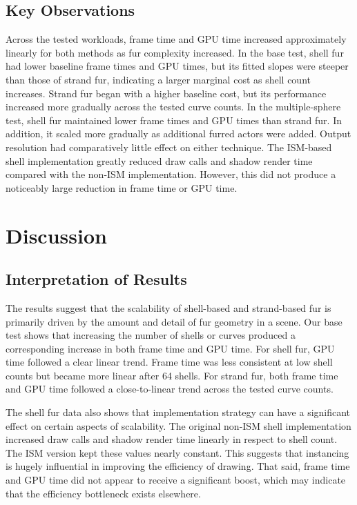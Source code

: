\documentclass{article}
\begin{document}
\subsection{Key Observations}

Across the tested workloads, frame time and GPU time increased approximately linearly for both methods as fur complexity increased. In the base test, shell fur had lower baseline frame times and GPU times, but its fitted slopes were steeper than those of strand fur, indicating a larger marginal cost as shell count increases. Strand fur began with a higher baseline cost, but its performance increased more gradually across the tested curve counts. In the multiple-sphere test, shell fur maintained lower frame times and GPU times than strand fur. In addition, it scaled more gradually as additional furred actors were added. Output resolution had comparatively little effect on either technique. The ISM-based shell implementation greatly reduced draw calls and shadow render time compared with the non-ISM implementation. However, this did not produce a noticeably large reduction in frame time or GPU time.

\section{Discussion}

\subsection{Interpretation of Results}

The results suggest that the scalability of shell-based and strand-based fur is primarily driven by the amount and detail of fur geometry in a scene. Our base test shows that increasing the number of shells or curves produced a corresponding increase in both frame time and GPU time. For shell fur, GPU time followed a clear linear trend. Frame time was less consistent at low shell counts but became more linear after 64 shells. For strand fur, both frame time and GPU time followed a close-to-linear trend across the tested curve counts. 

The shell fur data also shows that implementation strategy can have a significant effect on certain aspects of scalability. The original non-ISM shell implementation increased draw calls and shadow render time linearly in respect to shell count. The ISM version kept these values nearly constant. This suggests that instancing is hugely influential in improving the efficiency of drawing. That said, frame time and GPU time did not appear to receive a significant boost, which may indicate that the efficiency bottleneck exists elsewhere.
\end{document}
